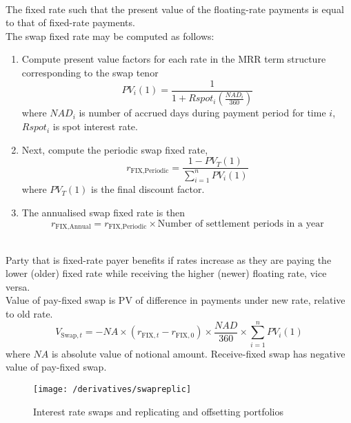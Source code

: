 \begin{remark} \\
The fixed rate such that the present value of the floating-rate payments is equal to that of fixed-rate payments.\\
The swap fixed rate may be computed as follows:
\begin{enumerate}[label=\roman*.]
\setlength{\itemsep}{0pt}
\item Compute present value factors for each rate in the MRR term structure corresponding to the swap tenor
\begin{equation}
PV_i(1) = \frac{1}{1 + Rspot_i\left(\frac{NAD_i}{360} \right)} \nonumber
\end{equation}
where $NAD_i$ is number of accrued days during payment period for time $i$, $Rspot_i$ is spot interest rate.
\item Next, compute the periodic swap fixed rate,
\begin{equation}
r_{\text{FIX}, \text{Periodic}} = \frac{1 - PV_T(1)}{\sum\limits_{i=1}^n PV_i(1)} \nonumber 
\end{equation}
where $PV_T(1)$ is the final discount factor.
\item The annualised swap fixed rate is then
\begin{equation}
r_{\text{FIX}, \text{Annual}} = r_{\text{FIX}, \text{Periodic}} \times \text{Number of settlement periods in a year} \nonumber
\end{equation}
\end{enumerate}
\end{remark}

\begin{remark} \\
Party that is fixed-rate payer benefits if rates increase as they are paying the lower (older) fixed rate while receiving the higher (newer) floating rate, vice versa.\\
Value of pay-fixed swap is PV of difference in payments under new rate, relative to old rate.
\begin{equation}
V_{\text{Swap}, t} = - NA \times (r_{\text{FIX},t} - r_{\text{FIX}, 0}) \times \frac{NAD}{360} \times \sum\limits_{i=1}^n PV_i(1) \nonumber
\end{equation}
where $NA$ is absolute value of notional amount. Receive-fixed swap has negative value of pay-fixed swap.
\end{remark}

\begin{figure}[H]
\centering
\texttt{[image: /derivatives/swapreplic]}
\caption{Interest rate swaps and replicating and offsetting portfolios}
\end{figure}

